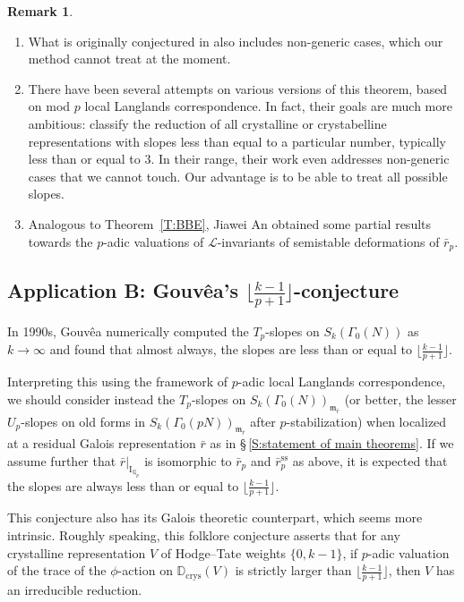 \documentclass[12pt]{amsart}
\theoremstyle{definition}
\newtheorem{remark}[subsection]{Remark}
\numberwithin{equation}{subsection}
\def\calL{\mathcal{L}}
\def\gothm{\mathfrak{m}}
\def\DD{\mathbb{D}}
\def\QQ{\mathbb{Q}}
\def\rmI{\mathrm{I}}
\newcommand{\crys}{\mathrm{crys}}
\begin{document}
\begin{remark}
\label{R:BBE}
\begin{enumerate}
\item What is originally conjectured in \cite[Corollary~4.1.1]{buzzard-gee} also includes non-generic cases, which our method cannot treat at the moment.
\item
There have been several attempts \cite{breuil-reduction, buzzard-gee-reduction, ghate1, ghate2, ghate3} on various versions of this theorem, based on mod $p$ local Langlands correspondence. In fact, their goals are much more ambitious: classify the reduction of all crystalline or crystabelline representations with slopes less than equal to a particular number, typically less than or equal to $3$.
In their range, their work even addresses non-generic cases that we cannot touch.
Our advantage is to be able to treat all possible slopes.

\item Analogous to Theorem~\ref{T:BBE}, Jiawei An \cite{an-slope} obtained some partial results towards the $p$-adic valuations of $\calL$-invariants of semistable deformations of $\bar r_p$.
\end{enumerate}
\end{remark}

\subsection{Application B: Gouv\^ea's $\big\lfloor\frac{k-1}{p+1}\big\rfloor$-conjecture}
\label{S:application B}
In  1990s, Gouv\^ea \cite[\S\,4]{gouvea} numerically computed the $T_p$-slopes on $S_k(\Gamma_0(N))$ as $k\to \infty$ and found that almost always, the slopes are less than or equal to $\big\lfloor\frac{k-1}{p+1}\big\rfloor$. 

Interpreting this using the framework of $p$-adic local Langlands correspondence, we should consider instead the $T_p$-slopes on $S_k(\Gamma_0(N))_{\gothm_{\bar r}}$ (or better, the lesser $U_p$-slopes on old forms in $S_k(\Gamma_0(pN))_{\gothm_{\bar r}}$ after $p$-stabilization) when localized at a residual Galois representation $\bar r$ as in  \S\,\ref{S:statement of main theorems}. If we assume further that $\bar r|_{\rmI_{\QQ_p}}$ is isomorphic to $\bar r_p$ and $\bar r_p^\mathrm{ss}$ as above, it is expected that the slopes are always less than or equal to $\big\lfloor\frac{k-1}{p+1}\big\rfloor$. 

This conjecture also has its Galois theoretic counterpart, which seems more intrinsic. Roughly speaking, this folklore conjecture asserts that for any crystalline representation $V$ of Hodge--Tate weights $\{0,k-1 \}$, if $p$-adic valuation of the trace of the $\phi$-action on $\DD_\crys(V)$ is strictly larger than $\big\lfloor\frac{k-1}{p+1}\big\rfloor$, then $V$ has an irreducible reduction.
\end{document}

